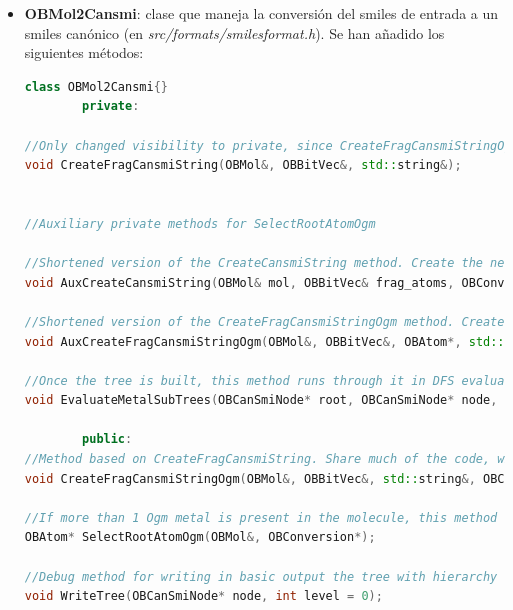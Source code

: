 \begin{itemize}
    \item \textbf{OBMol2Cansmi}: clase que maneja la conversión del smiles de entrada a un smiles canónico (en \textit{src/formats/smilesformat.h}). Se han añadido los siguientes métodos:
    \begin{lstlisting}[language=C++]
class OBMol2Cansmi{}
        private: 
    
//Only changed visibility to private, since CreateFragCansmiStringOgm was created. Selects the "root" atom, which will be first in the SMILES, then builds a tree in canonical order, and finally generates the SMILES.
void CreateFragCansmiString(OBMol&, OBBitVec&, std::string&);

    
//Auxiliary private methods for SelectRootAtomOgm

//Shortened version of the CreateCansmiString method. Create the necessary variables to call AuxCreateFragCansmiStringOgm.
void AuxCreateCansmiString(OBMol& mol, OBBitVec& frag_atoms, OBConversion* pConv, OBAtom* startatom, std::vector<SubTreeSizes*>& subtreeSizes, std::vector<OBAtom*> ogmAtoms);

//Shortened version of the CreateFragCansmiStringOgm method. Create the necessary variables to build a new canonical tree using as root @p startAtom
void AuxCreateFragCansmiStringOgm(OBMol&, OBBitVec&, OBAtom*, std::vector<SubTreeSizes*>&, std::vector<OBAtom*>);

//Once the tree is built, this method runs through it in DFS evaluating the subtrees hanging from the other ogm metals. Use the auxiliary struct SubTreeSizes for this. 
void EvaluateMetalSubTrees(OBCanSmiNode* root, OBCanSmiNode* node, std::vector<SubTreeSizes*>&, std::vector<OBAtom*>&, std::vector<int>&);

        public: 
//Method based on CreateFragCansmiString. Share much of the code, with some additional methods specifically for my own canonical form designed for organometallic molecules.
void CreateFragCansmiStringOgm(OBMol&, OBBitVec&, std::string&, OBConversion*);

//If more than 1 Ogm metal is present in the molecule, this method chooses one of them, based on some rules and the conectivity of the metal within the molecule and the rest of the atoms
OBAtom* SelectRootAtomOgm(OBMol&, OBConversion*);

//Debug method for writing in basic output the tree with hierarchy formating
void WriteTree(OBCanSmiNode* node, int level = 0);


\end{lstlisting}
\end{itemize}
